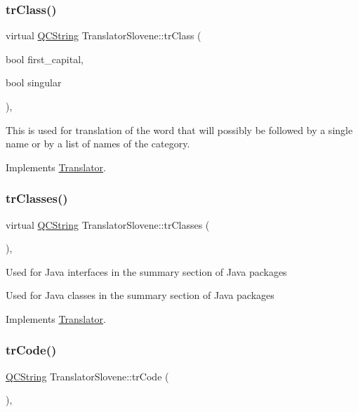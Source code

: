 \subsubsection{\texorpdfstring{trClass()}{trClass()}}
{\footnotesize\ttfamily virtual \mbox{\hyperlink{class_q_c_string}{Q\+C\+String}} Translator\+Slovene\+::tr\+Class (\begin{DoxyParamCaption}\item[{bool}]{first\+\_\+capital,  }\item[{bool}]{singular }\end{DoxyParamCaption})\hspace{0.3cm}{\ttfamily [inline]}, {\ttfamily [virtual]}}

This is used for translation of the word that will possibly be followed by a single name or by a list of names of the category. 

Implements \mbox{\hyperlink{class_translator}{Translator}}.

\mbox{\label{class_translator_slovene_a6c55696ab318e449705d76fef413f999}} 
\subsubsection{\texorpdfstring{trClasses()}{trClasses()}}
{\footnotesize\ttfamily virtual \mbox{\hyperlink{class_q_c_string}{Q\+C\+String}} Translator\+Slovene\+::tr\+Classes (\begin{DoxyParamCaption}{ }\end{DoxyParamCaption})\hspace{0.3cm}{\ttfamily [inline]}, {\ttfamily [virtual]}}

Used for Java interfaces in the summary section of Java packages

Used for Java classes in the summary section of Java packages 

Implements \mbox{\hyperlink{class_translator}{Translator}}.

\mbox{\label{class_translator_slovene_adc23d21c971c48973e458ffe62ea165e}} 
\subsubsection{\texorpdfstring{trCode()}{trCode()}}
{\footnotesize\ttfamily \mbox{\hyperlink{class_q_c_string}{Q\+C\+String}} Translator\+Slovene\+::tr\+Code (\begin{DoxyParamCaption}{ }\end{DoxyParamCaption})\hspace{0.3cm}{\ttfamily [inline]}, {\ttfamily [virtual]}}

